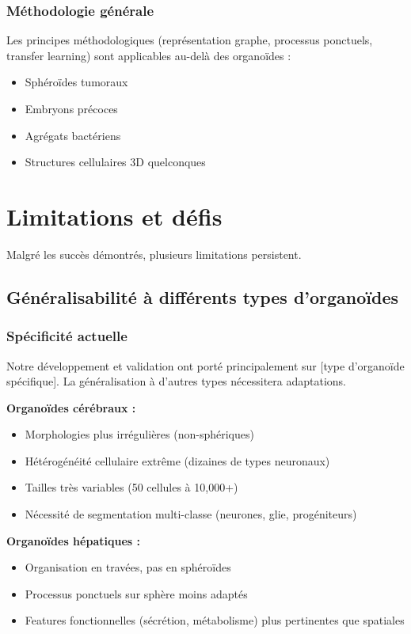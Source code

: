 \subsubsection{Méthodologie générale}

Les principes méthodologiques (représentation graphe, processus ponctuels, transfer learning) sont applicables au-delà des organoïdes :
\begin{itemize}
    \item Sphéroïdes tumoraux
    \item Embryons précoces
    \item Agrégats bactériens
    \item Structures cellulaires 3D quelconques
\end{itemize}

\section{Limitations et défis}

Malgré les succès démontrés, plusieurs limitations persistent.

\subsection{Généralisabilité à différents types d'organoïdes}

\subsubsection{Spécificité actuelle}

Notre développement et validation ont porté principalement sur [type d'organoïde spécifique]. La généralisation à d'autres types nécessitera adaptations.

\textbf{Organoïdes cérébraux :}
\begin{itemize}
    \item Morphologies plus irrégulières (non-sphériques)
    \item Hétérogénéité cellulaire extrême (dizaines de types neuronaux)
    \item Tailles très variables (50 cellules à 10,000+)
    \item Nécessité de segmentation multi-classe (neurones, glie, progéniteurs)
\end{itemize}

\textbf{Organoïdes hépatiques :}
\begin{itemize}
    \item Organisation en travées, pas en sphéroïdes
    \item Processus ponctuels sur sphère moins adaptés
    \item Features fonctionnelles (sécrétion, métabolisme) plus pertinentes que spatiales
\end{itemize}

